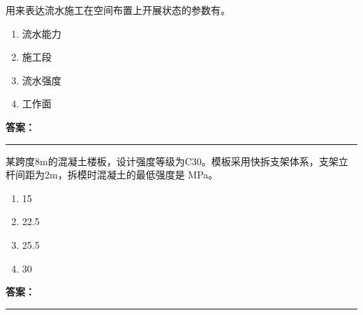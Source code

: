 \documentclass[UTF8,fontset=fandol,11pt]{ctexart}
\newcommand{\answerline}{\textcolor{answerred}{\rule{2.4cm}{0.7pt}}}
\begin{document}
\begin{quizbox}[title={乱序第 249 题｜第十章流水施工原理}]

用来表达流水施工在空间布置上开展状态的参数有。\\

\begin{enumerate}[label=\Alph*.]

\item 流水能力

\item 施工段

\item 流水强度

\item 工作面

\end{enumerate}

\textbf{\textcolor{answerred}{答案：}} \answerline

\end{quizbox}

\vspace{0.2em}

\begin{quizbox}[title={乱序第 250 题｜第四章混凝土结构工程}]

某跨度8m的混凝土楼板，设计强度等级为C30。模板采用快拆支架体系，支架立杆间距为2m，拆模时混凝土的最低强度是 MPa。\\

\begin{enumerate}[label=\Alph*.]

\item 15

\item 22.5

\item 25.5

\item 30

\end{enumerate}

\textbf{\textcolor{answerred}{答案：}} \answerline

\end{quizbox}

\vspace{0.2em}
\end{document}
